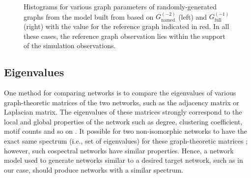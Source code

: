 \documentclass[11]{article}
\newcommand{\namedtwo}{G_{\textrm{named}}^{(-2)}}
\newcommand{\fullone}{G_{\textrm{full}}^{(-1)}}
\theoremstyle{remark}
\theoremstyle{definition}
\begin{document}
\begin{figure} [h!]
  \caption{Histograms for various graph parameters of randomly-generated graphs from the model built from based on $\namedtwo$ (left) and $\fullone$ (right) with the value for the reference graph indicated in red. In all these cases, the reference graph observation lies within the support of the simulation observations.}
\label{fig:namedhists}
\end{figure}





\subsection{Eigenvalues}

One method for comparing networks is to compare the eigenvalues of various graph-theoretic matrices of the two networks, such as the adjacency matrix or Laplacian matrix. The eigenvalues of these matrices strongly correspond to the local and global properties of the network such as degree, clustering coefficient, motif counts and so on \cite{chung1997spectral}. It possible for two non-isomorphic networks to have the exact same spectrum (i.e., set of eigenvalues) for these graph-theoretic matrices \cite{godsil1982constructing}; however, such cospectral networks have similar properties. Hence, a network model used to generate networks similar to a desired target network, such as in our case, should produce networks with a similar spectrum.
\end{document}
